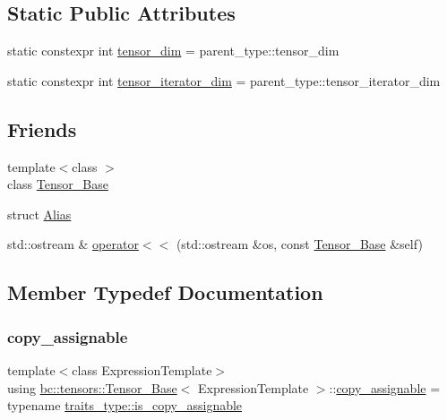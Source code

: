 \subsection*{Static Public Attributes}
\begin{DoxyCompactItemize}
\item 
static constexpr int \hyperlink{classbc_1_1tensors_1_1Tensor__Base_a0061d78358d7085b63ee03309b4ac84f}{tensor\+\_\+dim} = parent\+\_\+type\+::tensor\+\_\+dim
\item 
static constexpr int \hyperlink{classbc_1_1tensors_1_1Tensor__Base_af0e5a8a4150e1345013cc05a6087d00b}{tensor\+\_\+iterator\+\_\+dim} = parent\+\_\+type\+::tensor\+\_\+iterator\+\_\+dim
\end{DoxyCompactItemize}
\subsection*{Friends}
\begin{DoxyCompactItemize}
\item 
{\footnotesize template$<$class $>$ }\\class \hyperlink{classbc_1_1tensors_1_1Tensor__Base_a794d203bce037da65d945527a3fe4837}{Tensor\+\_\+\+Base}
\item 
struct \hyperlink{classbc_1_1tensors_1_1Tensor__Base_a6d393379422d905c0c4b43a46e28e87f}{Alias}
\item 
std\+::ostream \& \hyperlink{classbc_1_1tensors_1_1Tensor__Base_a44788e503facb5a5c96020dac445a9a0}{operator$<$$<$} (std\+::ostream \&os, const \hyperlink{classbc_1_1tensors_1_1Tensor__Base}{Tensor\+\_\+\+Base} \&self)
\end{DoxyCompactItemize}


\subsection{Member Typedef Documentation}
\mbox{\label{classbc_1_1tensors_1_1Tensor__Base_ac2f69c5c3442940a65231923d6063544}} 
\subsubsection{\texorpdfstring{copy\+\_\+assignable}{copy\_assignable}}
{\footnotesize\ttfamily template$<$class Expression\+Template$>$ \\
using \hyperlink{classbc_1_1tensors_1_1Tensor__Base}{bc\+::tensors\+::\+Tensor\+\_\+\+Base}$<$ Expression\+Template $>$\+::\hyperlink{classbc_1_1tensors_1_1Tensor__Base_ac2f69c5c3442940a65231923d6063544}{copy\+\_\+assignable} =  typename \hyperlink{structbc_1_1tensors_1_1exprs_1_1expression__traits_ae5b90ffbe5ee242543685ac0905d8aec}{traits\+\_\+type\+::is\+\_\+copy\+\_\+assignable}}

